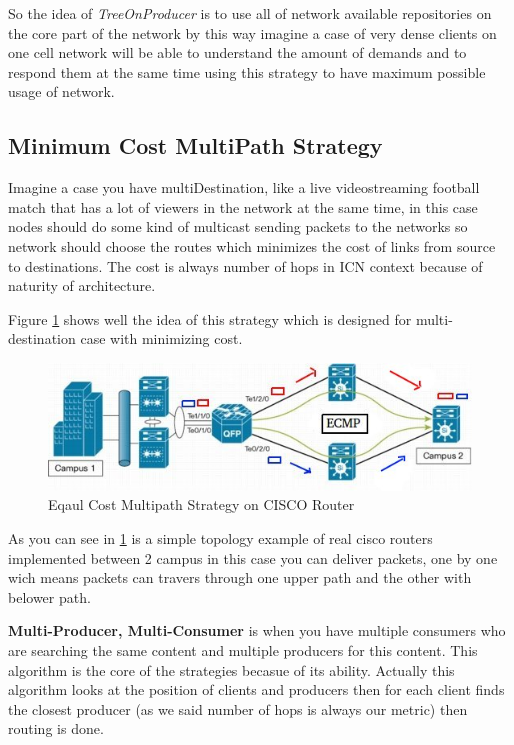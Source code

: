 So the idea of \textit{TreeOnProducer} is to use all of network available repositories on the core part of the network by this way imagine a case of very dense clients on one cell network will be able to understand the amount of demands and to respond them at the same time using this strategy to have maximum possible usage of network. 

\subsection{Minimum Cost MultiPath Strategy}
Imagine a case you have multiDestination, like a live videostreaming football match that has a lot of viewers in the network at the same time, in this case nodes should do some kind of multicast sending packets to the networks so network should choose the routes which minimizes the cost of links from source to destinations. The cost is always number of hops in ICN context because of naturity of architecture. 

Figure \ref{balance} shows well the idea of this strategy which is designed for multi-destination case with minimizing cost.

\begin{figure}[H]

\begin{center}

\includegraphics[scale = 0.7]{Pictures/balance.jpg}

\caption{Eqaul Cost Multipath Strategy on CISCO Router} \label{balance} 

\end{center}

\end{figure}

As you can see in \ref{balance} is a simple topology example of real cisco routers implemented between 2 campus in this case you can deliver packets, one by one wich means packets can travers through one upper path and the other with belower path.

\textbf{Multi-Producer, Multi-Consumer} is when you have multiple consumers who are searching the same content and multiple producers for this content. This algorithm is the core of the strategies becasue of its ability. Actually this algorithm looks at the position of clients and producers then for each client finds the closest producer (as we said number of hops is always our metric) then routing is done.



